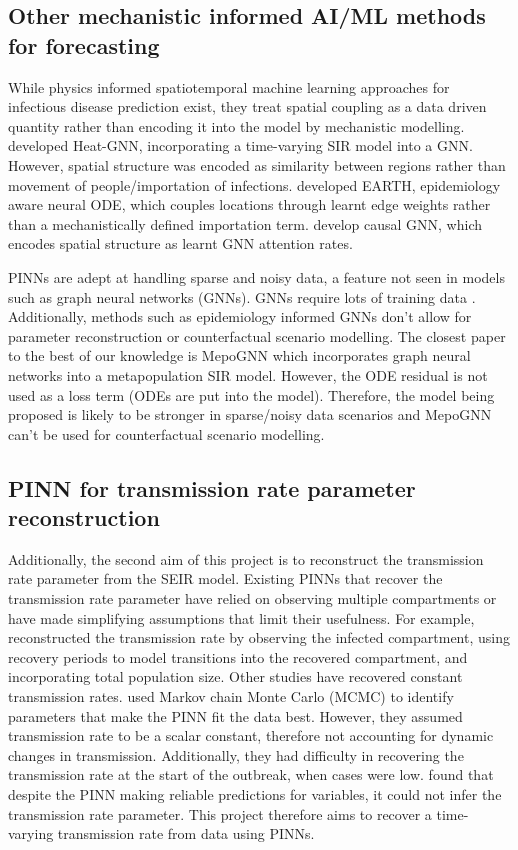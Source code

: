 \documentclass{article}
\begin{document}
\subsection{Other mechanistic informed AI/ML methods for forecasting}
While physics informed spatiotemporal machine learning approaches for infectious disease prediction exist, they treat spatial coupling as a data driven quantity rather than encoding it into the model by mechanistic modelling. \parencite{https://doi.org/10.48550/arxiv.2411.17372} developed Heat-GNN, incorporating a time-varying SIR model into a GNN. However, spatial structure was encoded as similarity between regions rather than movement of people/importation of infections. \parencite{https://doi.org/10.48550/arxiv.2410.00049} developed EARTH, epidemiology aware neural ODE, which couples locations through learnt edge weights rather than a mechanistically defined importation term. \parencite{Wang2022} develop causal GNN, which encodes spatial structure as learnt GNN attention rates.

PINNs are adept at handling sparse and noisy data, a feature not seen in models such as graph neural networks (GNNs). GNNs require lots of training data \parencite{Liu2024}. Additionally, methods such as epidemiology informed GNNs don't allow for parameter reconstruction or counterfactual scenario modelling. The closest paper to the best of our knowledge is MepoGNN which incorporates graph neural networks into a metapopulation SIR model. However, the ODE residual is not used as a loss term (ODEs are put into the model). Therefore, the model being proposed is likely to be stronger in sparse/noisy data scenarios and MepoGNN can't be used for counterfactual scenario modelling.

\subsection{PINN for transmission rate parameter reconstruction}
Additionally, the second aim of this project is to reconstruct the transmission rate parameter from the SEIR model. Existing PINNs that recover the transmission rate parameter have relied on observing multiple compartments or have made simplifying assumptions that limit their usefulness. For example, \parencite{https://doi.org/10.48550/arxiv.2510.06776} reconstructed the transmission rate by observing the infected compartment, using recovery periods to model transitions into the recovered compartment, and incorporating total population size. Other studies have recovered constant transmission rates. \parencite{https://doi.org/10.48550/arxiv.2506.03897} used Markov chain Monte Carlo (MCMC) to identify parameters that make the PINN fit the data best. However, they assumed transmission rate to be a scalar constant, therefore not accounting for dynamic changes in transmission. Additionally, they had difficulty in recovering the transmission rate at the start of the outbreak, when cases were low. \parencite{Qian2025} found that despite the PINN making reliable predictions for variables, it could not infer the transmission rate parameter. This project therefore aims to recover a time-varying transmission rate from data using PINNs.
\end{document}
